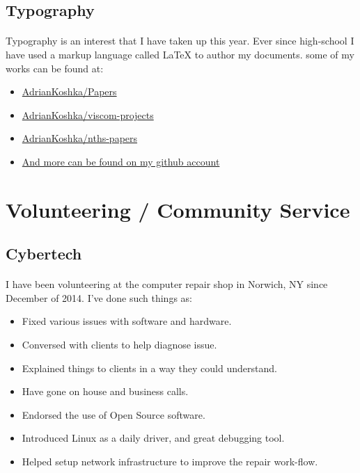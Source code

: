 \subsection{Typography}
\paragraph{}
Typography is an interest that I have taken up this year. Ever since high-school
I have used a markup language called \LaTeX{} to author my documents. some of my
works can be found at:
\par

\begin{itemize}
	\item \href{https://github.com/AdrianKoshka/Papers}{AdrianKoshka/Papers}
	\item \href{https://github.com/AdrianKoshka/viscom-projects}{AdrianKoshka/viscom-projects}
	\item \href{https://github.com/AdrianKoshka/nths-papers}{AdrianKoshka/nths-papers}
	\item \href{https://github.com/AdrianKoshka}{And more can be found on my github account}
\end{itemize}

\section{Volunteering / Community Service}

\subsection{Cybertech}
\paragraph{}
I have been volunteering at the computer repair shop in Norwich, NY since
December of 2014. I've done such things as:

\begin{itemize}
	\item {Fixed various issues with software and hardware.}
	\item {Conversed with clients to help diagnose issue.}
	\item {Explained things to clients in a way they could understand.}
	\item {Have gone on house and business calls.}
	\item {Endorsed the use of Open Source software.}
	\item {Introduced Linux as a daily driver, and great debugging tool.}
	\item {Helped setup network infrastructure to improve the repair work-flow.}
\end{itemize}
\par

